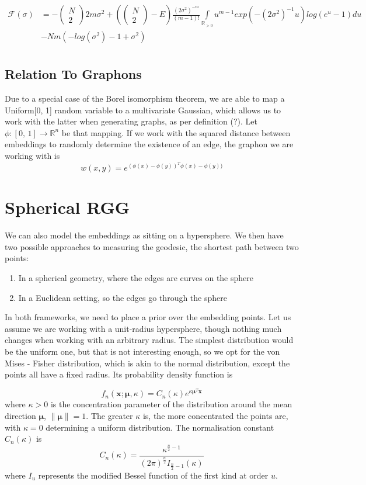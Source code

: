 \documentclass[12pt]{report}
\newcommand{\bs}{\boldsymbol}
\newcommand{\mc}[1]{\mathcal{#1}}
\newcommand{\mb}[1]{\mathbb{#1}}
\newcommand{\comb}[2]{\begin{pmatrix}#1 \\ #2\end{pmatrix}}
\renewcommand{\bs}{\boldsymbol}
\begin{document}
\begin{align*}
    \mc{F}(\sigma) &= -\comb{N}{2}2m\sigma^2 + \left(\comb{N}{2} - E\right)\frac{(2\sigma^2)^{-m}}{(m-1)!}\int\limits_{\mb{R}_{>0}} u^{m-1}exp(-(2\sigma^2)^{-1}u) log(e^{u} - 1) du \\
    &- Nm(-log(\sigma^2) - 1 + \sigma^2) \\
\end{align*}

\subsection{Relation To Graphons}
Due to a special case of the Borel isomorphism theorem, we are able to map a Uniform[0, 1] random variable to a multivariate Gaussian, which allows us to work with the latter when generating graphs, as per definition (?). Let $\phi : [0,\,1] \rightarrow \mb{R}^n$ be that mapping. If we work with the squared distance between embeddings to randomly determine the existence of an edge, the graphon we are working with is
\begin{equation}
    w(x, y) = e^{(\phi (x) - \phi (y))^T\phi (x) - \phi (y))}
\end{equation}

\section{Spherical RGG}
We can also model the embeddings as sitting on a hypersphere. We then have two possible approaches to measuring the geodesic, the shortest path between two points:
\begin{enumerate}
    \item In a spherical geometry, where the edges are curves on the sphere
    \item In a Euclidean setting, so the edges go through the sphere
\end{enumerate}

In both frameworks, we need to place a prior over the embedding points. Let us assume we are working with a unit-radius hypersphere, though nothing much changes when working with an arbitrary radius. The simplest distribution would be the uniform one, but that is not interesting enough, so we opt for the von Mises - Fisher distribution, which is akin to the normal distribution, except the points all have a fixed radius. Its probability density function is

\begin{equation}
    f_n(\bs{x}; \bs{\mu}, \kappa) = C_n(\kappa) e^{\kappa \bs{\mu}^T \bs{x}}
\end{equation}
where $\kappa > 0$ is the concentration parameter of the distribution around the mean direction $\bs{\mu}$, $\lVert \bs{\mu} \rVert = 1$. The greater $\kappa$ is, the more concentrated the points are, with $\kappa = 0$ determining a uniform distribution. The normalisation constant $C_n(\kappa)$ is
\begin{equation}
    C_n(\kappa) = \frac{\kappa^{\frac{n}{2} - 1}}{(2\pi)^{\frac{n}{2}}I_{\frac{n}{2} - 1}(\kappa)}
\end{equation}
where $I_u$ represents the modified Bessel function of the first kind at order $u$. \\
\end{document}
